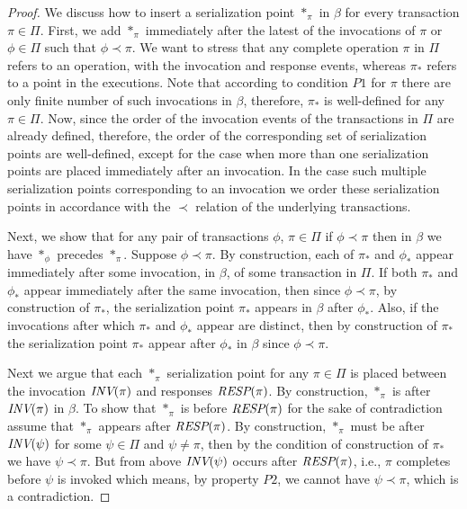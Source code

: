 \begin{proof}We discuss how to insert a serialization point $*_{\pi}$ in $\beta$ for every transaction $\pi \in \Pi$. 
First, we add  $*_{\pi}$ immediately after the latest of the invocations of $\pi$ or $\phi \in \Pi$ such that $\phi \prec \pi$.
We want to stress that any complete operation $\pi$ in $\Pi$  refers to an operation, with the invocation and response events, whereas
$\pi_*$ refers to a point in the executions.
Note that according to condition $P1$ for $\pi$ there are only finite number of such  invocations in
 $\beta$, therefore, $\pi_*$ is well-defined for any $\pi \in \Pi$. Now, since the order of the invocation events of the 
transactions in $\Pi$ are already defined, therefore,  the order of the corresponding set of serialization points are 
well-defined, except for the case when more than one serialization points are placed immediately after an 
invocation.
 In the case such multiple  serialization points corresponding to an invocation we order  these 
serialization points  in accordance with the $\prec$  relation of  the underlying transactions.

Next, we show that for any pair of transactions $\phi$, $\pi \in \Pi$ if $\phi \prec \pi$ then in $\beta$ we have $*_{\phi}$ precedes $*_{\pi}$.
Suppose $\phi \prec \pi$. By construction,  each of $\pi_*$ and $\phi_*$ appear immediately after 
some invocation, in $\beta$,  of some transaction in $\Pi$. If both $\pi_*$ and $\phi_*$ appear immediately  after 
the same invocation, then since $\phi \prec \pi$,  by construction of $\pi_*$,  the serialization point $\pi_*$ appears in $\beta$ after 
$\phi_*$.  Also, if the invocations after which $\pi_*$ and $\phi_*$ appear are distinct,  then by 
construction of $\pi_*$ the serialization point  $\pi_*$ appear after $\phi_*$ in $\beta$ since $\phi \prec \pi$.


Next we argue that each $*_{\pi}$  serialization point  for any $\pi \in \Pi$ is placed between the 
invocation ${\textit{INV}(\pi)}$ and responses ${\textit{RESP}(\pi)}$. By construction, $*_{\pi}$ is after ${\textit{INV}(\pi)}$ in $\beta$. To 
show that $*_{\pi}$ is before ${\textit{RESP}(\pi)}$ for the sake   of contradiction assume that  $*_{\pi}$  
appears after ${\textit{RESP}(\pi)}$. By construction, $*_{\pi}$ must be after ${\textit{INV}(\psi)}$ for some 
$\psi \in \Pi$ and $\psi \neq \pi$, then by the condition of construction of $\pi_*$ we have $\psi \prec 
\pi$. But from above 
${\textit{INV}(\psi)}$ occurs after ${\textit{RESP}(\pi)}$, i.e., $\pi$ completes before $\psi$ is invoked which means, by 
property $P2$,  we cannot have $\psi \prec \pi$, which is a contradiction.


\end{proof}
